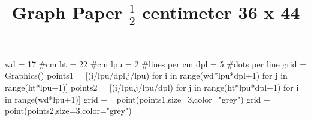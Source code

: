 \documentclass[12pt]{article}
\title{Graph Paper $\frac{1}{2}$ centimeter 36 x 44}
\begin{document}
\thispagestyle{firststyle}

\begin{sagesilent}
wd = 17 #cm
ht = 22 #cm
lpu = 2 #lines per cm
dpl = 5 #dots per line
grid = Graphics()
points1 = [(i/lpu/dpl,j/lpu) for i in range(wd*lpu*dpl+1) for j in range(ht*lpu+1)]
points2 = [(i/lpu,j/lpu/dpl) for j in range(ht*lpu*dpl+1) for i in range(wd*lpu+1)]
grid += point(points1,size=3,color="grey")
grid += point(points2,size=3,color="grey")
\end{sagesilent}

\begin{center}
\end{center}

\newpage

\begin{center}
\end{center}
\end{document}

